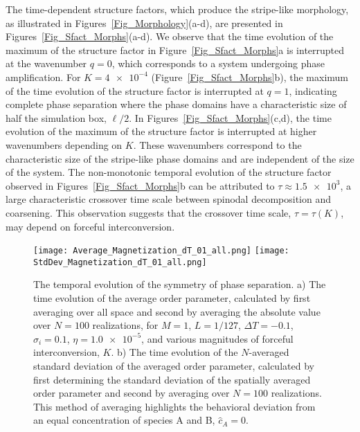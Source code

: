 \documentclass[5p,twocolumn]{elsarticle}
\begin{document}
The time-dependent structure factors, which produce the stripe-like morphology, as illustrated in Figures~\ref{Fig_Morphology}(a-d), are presented in Figures~\ref{Fig_Sfact_Morphs}(a-d). We observe that the time evolution of the maximum of the structure factor in Figure~\ref{Fig_Sfact_Morphs}a is interrupted at the wavenumber $q = 0$, which corresponds to a system undergoing phase amplification. For $K=\num{4e-4}$ (Figure~\ref{Fig_Sfact_Morphs}b), the maximum of the time evolution of the structure factor is interrupted at $q=1$, indicating complete phase separation where the phase domains have a characteristic size of half the simulation box, $\ell/2$. In Figures~\ref{Fig_Sfact_Morphs}(c,d), the time evolution of the maximum of the structure factor is interrupted at higher wavenumbers depending on $K$. These wavenumbers correspond to the characteristic size of the stripe-like phase domains and are independent of the size of the system. The non-monotonic temporal evolution of the structure factor observed in Figures~\ref{Fig_Sfact_Morphs}b can be attributed to $\tau\approx \num{1.5e3}$, a large characteristic crossover time scale between spinodal decomposition and coarsening. This observation suggests that the crossover time scale, $\tau = \tau(K)$, may depend on forceful interconversion.

\begin{figure}[h!]
    \centering
    \texttt{[image: Average\_Magnetization\_dT\_01\_all.png]}
    \texttt{[image: StdDev\_Magnetization\_dT\_01\_all.png]}
    \caption{The temporal evolution of the symmetry of phase separation. a) The time evolution of the average order parameter, calculated by first averaging over all space and second by averaging the absolute value over $N=100$ realizations, for $M=1$, $L=1/127$, $\Delta T = -0.1$, $\sigma_i=0.1$, $\eta = \num{1.0e-5}$, and various magnitudes of forceful interconversion, $K$. b) The time evolution of the $N$-averaged standard deviation of the averaged order parameter, calculated by first determining the standard deviation of the spatially averaged order parameter and second by averaging over $N=100$ realizations. This method of averaging highlights the behavioral deviation from an equal concentration of species A and B, $\hat{c}_A=0$.}
    \label{Fig_AvgMag_Std}
\end{figure}
\end{document}
